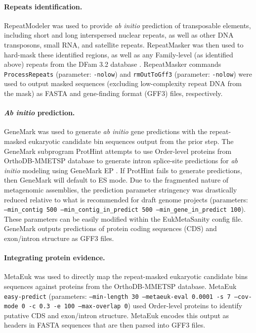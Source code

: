 \documentclass[12pt]{article}
\numberwithin{equation}{section}
\begin{document}
\paragraph{Repeats identification.} RepeatModeler \citep{Flynn-RM, RepeatModeler} was used to provide \textit{ab initio} prediction of transposable elements, including short and long interspersed nuclear repeats, as well as other DNA transposons, small RNA, and satellite repeats. RepeatMasker \citep{RepeatMasker} was then used to hard-mask these identified regions, as well as any Family-level (as identified above) repeats from the DFam 3.2 database \citep{Flynn2020}. RepeatMasker commands \texttt{ProcessRepeats} (parameter: \texttt{-nolow}) and \texttt{rmOutToGff3} (parameter: \texttt{-nolow}) were used to output masked sequences (excluding low-complexity repeat DNA from the mask) as FASTA and gene-finding format (GFF3) files, respectively. 

\paragraph{\textit{Ab initio} prediction.}  GeneMark \citep{Lomsadze2005} was used to generate \textit{ab initio} gene predictions with the repeat-masked eukaryotic candidate bin sequences output from the prior step. The GeneMark subprogram ProtHint attempts to use Order-level proteins from OrthoDB-MMETSP database to generate intron splice-site predictions for \textit{ab initio} modeling using GeneMark EP  \citep{Bruna2020}. If ProtHint fails to generate predictions, then GeneMark will default to ES mode. Due to the fragmented nature of metagenomic assemblies, the prediction parameter stringency was drastically reduced relative to what is recommended for draft genome projects (parameters: \texttt{--min\_contig 500 --min\_contig\_in\_predict 500 --min\_gene\_in\_predict 100}). These parameters can be easily modified within the EukMetaSanity config file. GeneMark outputs predictions of protein coding sequences (CDS) and exon/intron structure as GFF3 files. 


\paragraph{Integrating protein evidence.} MetaEuk \citep{LevyKarin2020} was used to directly map the repeat-masked eukaryotic candidate bins sequences against proteins from the OrthoDB-MMETSP database. MetaEuk \texttt{easy-predict} (parameters: \texttt{--min-length 30 --metaeuk-eval 0.0001 -s 7 --cov-mode 0 -c 0.3 -e 100 --max-overlap 0}) used Order-level proteins to identify putative CDS and exon/intron structure. MetaEuk encodes this output as headers in FASTA sequences that are then parsed into GFF3 files. 
\end{document}
